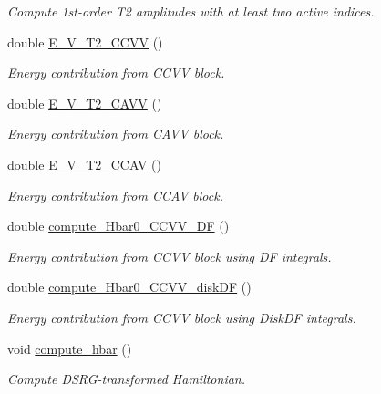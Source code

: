 \begin{DoxyCompactItemize}
\begin{DoxyCompactList}\small\item\em Compute 1st-\/order T2 amplitudes with at least two active indices. \end{DoxyCompactList}\item 
double \mbox{\hyperlink{classforte_1_1_s_a___m_r_p_t2_a6821491254ad4ddb30df2dead9d6b8b0}{E\+\_\+\+V\+\_\+\+T2\+\_\+\+C\+C\+VV}} ()
\begin{DoxyCompactList}\small\item\em Energy contribution from C\+C\+VV block. \end{DoxyCompactList}\item 
double \mbox{\hyperlink{classforte_1_1_s_a___m_r_p_t2_a3b074461c6935fa9716386da886d0858}{E\+\_\+\+V\+\_\+\+T2\+\_\+\+C\+A\+VV}} ()
\begin{DoxyCompactList}\small\item\em Energy contribution from C\+A\+VV block. \end{DoxyCompactList}\item 
double \mbox{\hyperlink{classforte_1_1_s_a___m_r_p_t2_af02065b0d7e59a7ff6dfc3afe55e7383}{E\+\_\+\+V\+\_\+\+T2\+\_\+\+C\+C\+AV}} ()
\begin{DoxyCompactList}\small\item\em Energy contribution from C\+C\+AV block. \end{DoxyCompactList}\item 
double \mbox{\hyperlink{classforte_1_1_s_a___m_r_p_t2_ae880649a8c0717cf7f0edcebec9c4198}{compute\+\_\+\+Hbar0\+\_\+\+C\+C\+V\+V\+\_\+\+DF}} ()
\begin{DoxyCompactList}\small\item\em Energy contribution from C\+C\+VV block using DF integrals. \end{DoxyCompactList}\item 
double \mbox{\hyperlink{classforte_1_1_s_a___m_r_p_t2_a2589c3f7a1ba682ede3ce1e4251503af}{compute\+\_\+\+Hbar0\+\_\+\+C\+C\+V\+V\+\_\+disk\+DF}} ()
\begin{DoxyCompactList}\small\item\em Energy contribution from C\+C\+VV block using Disk\+DF integrals. \end{DoxyCompactList}\item 
void \mbox{\hyperlink{classforte_1_1_s_a___m_r_p_t2_ad129f5985d7f9d66fbc3f0d69a0f61ff}{compute\+\_\+hbar}} ()
\begin{DoxyCompactList}\small\item\em Compute D\+S\+R\+G-\/transformed Hamiltonian. \end{DoxyCompactList}\item 

\end{DoxyCompactItemize}
